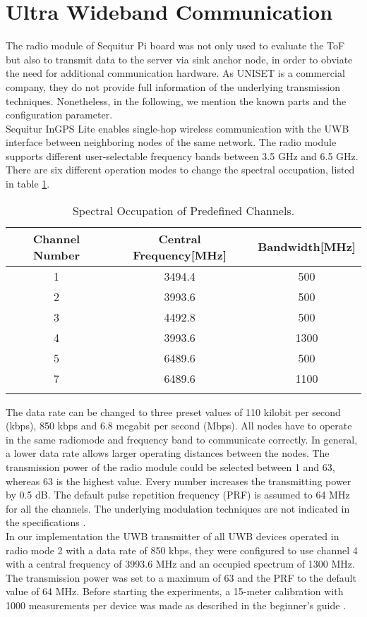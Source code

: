 \section{Ultra Wideband Communication}
The radio module of Sequitur Pi board was not only used  to evaluate the ToF but also to transmit data to the server via sink anchor node, in order to obviate the need for additional communication hardware. As UNISET is a commercial company, they do not provide full information of the underlying transmission techniques. Nonetheless, in the following, we mention the known parts and the configuration parameter.\\
\noindent\hspace*{5mm}%
Sequitur InGPS Lite enables single-hop wireless communication with the UWB interface between neighboring nodes of the same network. The radio module supports different user-selectable frequency bands between 3.5 GHz and 6.5 GHz. There are six different operation modes to change the spectral occupation, listed in table \ref{tab:spectral_occupation}.\\
\begin{table}
\caption{Spectral Occupation of Predefined Channels.}
\label{tab:spectral_occupation}
\centering
\begin{tabular}{c c c}
\toprule
\textbf{Channel Number} & \textbf{Central Frequency}[MHz] & \textbf{Bandwidth}[MHz]\\
\midrule
1 & 3494.4 & 500\\
2 & 3993.6 & 500\\
3 & 4492.8 & 500\\
4 & 3993.6 & 1300\\
5 & 6489.6 & 500\\
7 & 6489.6 & 1100\\
\bottomrule\\
\end{tabular}
\end{table}
The data rate can be changed to three preset values of 110 kilobit per second (kbps), 850 kbps and 6.8 megabit per second (Mbps). All nodes have to operate in the same radiomode and frequency band to communicate correctly. In general, a lower data rate allows larger operating distances between the nodes. The transmission power of the radio module could be selected between 1 and 63, whereas 63 is the highest value. Every number increases the transmitting power by 0.5 dB. The default pulse repetition frequency (PRF) is assumed to 64 MHz for all the channels. The underlying modulation techniques are not indicated in the specifications \cite{Usermanual, Beginnersguide}.\\
\noindent\hspace*{5mm}%
In our implementation the UWB transmitter of all UWB devices operated in radio mode 2 with a data rate of 850 kbps, they were configured to use channel 4 with a central frequency of 3993.6 MHz and an occupied spectrum of 1300 MHz. The transmission power was set to a maximum of 63 and the PRF to the default value of 64 MHz. Before starting the experiments, a 15-meter calibration with 1000 measurements per device was made as described in the beginner's guide \cite{Beginnersguide}.